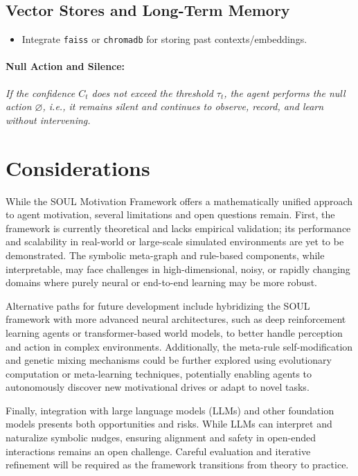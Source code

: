 \documentclass[11pt]{article}
\begin{document}
\subsection{Vector Stores and Long-Term Memory}
\begin{itemize}
  \item Integrate \texttt{faiss} or \texttt{chromadb} for storing past contexts/embeddings.
\end{itemize}

\paragraph{Null Action and Silence:}
\textit{If the confidence $C_t$ does not exceed the threshold $\tau_t$, the agent performs the null action $\varnothing$, i.e., it remains silent and continues to observe, record, and learn without intervening.}

\section{Considerations}
While the SOUL Motivation Framework offers a mathematically unified approach to agent motivation, several limitations and open questions remain. First, the framework is currently theoretical and lacks empirical validation; its performance and scalability in real-world or large-scale simulated environments are yet to be demonstrated. The symbolic meta-graph and rule-based components, while interpretable, may face challenges in high-dimensional, noisy, or rapidly changing domains where purely neural or end-to-end learning may be more robust.

Alternative paths for future development include hybridizing the SOUL framework with more advanced neural architectures, such as deep reinforcement learning agents or transformer-based world models, to better handle perception and action in complex environments. Additionally, the meta-rule self-modification and genetic mixing mechanisms could be further explored using evolutionary computation or meta-learning techniques, potentially enabling agents to autonomously discover new motivational drives or adapt to novel tasks.

Finally, integration with large language models (LLMs) and other foundation models presents both opportunities and risks. While LLMs can interpret and naturalize symbolic nudges, ensuring alignment and safety in open-ended interactions remains an open challenge. Careful evaluation and iterative refinement will be required as the framework transitions from theory to practice.
\end{document}
